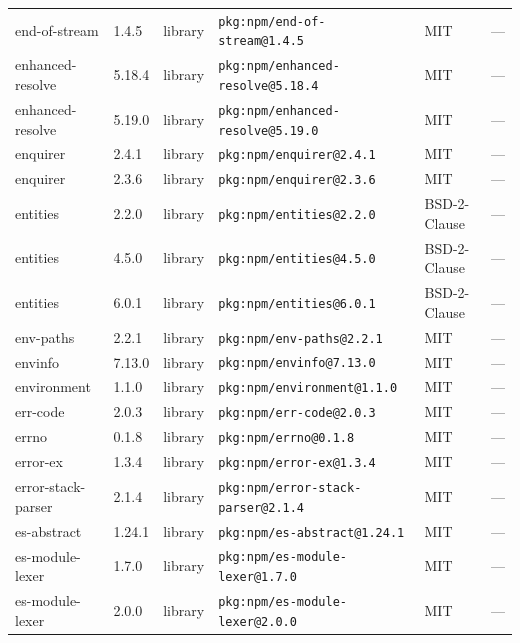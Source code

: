 \documentclass[11pt,a4paper]{article}
\begin{document}
\begin{longtable}{|p{4cm}|p{2cm}|p{1.6cm}|p{5cm}|p{1.5cm}|p{3.5cm}|}
\raggedright end-of-stream & 1.4.5 & library & \small\texttt{pkg:npm/end-of-stream@1.4.5} & MIT & \small — \\
\raggedright enhanced-resolve & 5.18.4 & library & \small\texttt{pkg:npm/enhanced-resolve@5.18.4} & MIT & \small — \\
\raggedright enhanced-resolve & 5.19.0 & library & \small\texttt{pkg:npm/enhanced-resolve@5.19.0} & MIT & \small — \\
\raggedright enquirer & 2.4.1 & library & \small\texttt{pkg:npm/enquirer@2.4.1} & MIT & \small — \\
\raggedright enquirer & 2.3.6 & library & \small\texttt{pkg:npm/enquirer@2.3.6} & MIT & \small — \\
\raggedright entities & 2.2.0 & library & \small\texttt{pkg:npm/entities@2.2.0} & BSD-2-Clause & \small — \\
\raggedright entities & 4.5.0 & library & \small\texttt{pkg:npm/entities@4.5.0} & BSD-2-Clause & \small — \\
\raggedright entities & 6.0.1 & library & \small\texttt{pkg:npm/entities@6.0.1} & BSD-2-Clause & \small — \\
\raggedright env-paths & 2.2.1 & library & \small\texttt{pkg:npm/env-paths@2.2.1} & MIT & \small — \\
\raggedright envinfo & 7.13.0 & library & \small\texttt{pkg:npm/envinfo@7.13.0} & MIT & \small — \\
\raggedright environment & 1.1.0 & library & \small\texttt{pkg:npm/environment@1.1.0} & MIT & \small — \\
\raggedright err-code & 2.0.3 & library & \small\texttt{pkg:npm/err-code@2.0.3} & MIT & \small — \\
\raggedright errno & 0.1.8 & library & \small\texttt{pkg:npm/errno@0.1.8} & MIT & \small — \\
\raggedright error-ex & 1.3.4 & library & \small\texttt{pkg:npm/error-ex@1.3.4} & MIT & \small — \\
\raggedright error-stack-parser & 2.1.4 & library & \small\texttt{pkg:npm/error-stack-parser@2.1.4} & MIT & \small — \\
\raggedright es-abstract & 1.24.1 & library & \small\texttt{pkg:npm/es-abstract@1.24.1} & MIT & \small — \\
\raggedright es-module-lexer & 1.7.0 & library & \small\texttt{pkg:npm/es-module-lexer@1.7.0} & MIT & \small — \\
\raggedright es-module-lexer & 2.0.0 & library & \small\texttt{pkg:npm/es-module-lexer@2.0.0} & MIT & \small — \\

\end{longtable}
\end{document}
